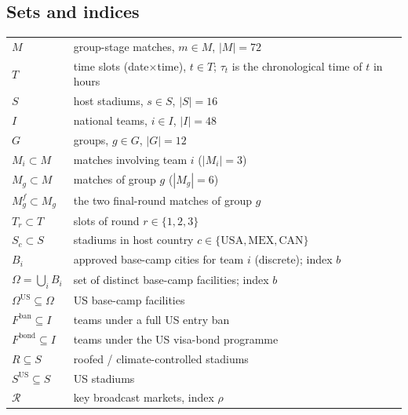 \documentclass[12pt, letterpaper]{article}
\begin{document}
\subsection*{Sets and indices}
\begin{tabular}{@{}lp{11.2cm}@{}}
\toprule
$M$ & group-stage matches, $m\in M$, $|M|=72$ \\
$T$ & time slots (date$\times$time), $t\in T$; $\tau_t$ is the
      chronological time of $t$ in hours \\
$S$ & host stadiums, $s\in S$, $|S|=16$ \\
$I$ & national teams, $i\in I$, $|I|=48$ \\
$G$ & groups, $g\in G$, $|G|=12$ \\
$M_i\subset M$ & matches involving team $i$ ($|M_i|=3$) \\
$M_g\subset M$ & matches of group $g$ ($|M_g|=6$) \\
$M_g^{f}\subset M_g$ & the two final-round matches of group $g$ \\
$T_r\subset T$ & slots of round $r\in\{1,2,3\}$ \\
$S_c\subset S$ & stadiums in host country $c\in\{\mathrm{USA,MEX,CAN}\}$ \\
$B_i$ & approved base-camp cities for team $i$ (discrete); index $b$ \\
$\Omega=\bigcup_i B_i$ & set of distinct base-camp facilities; index $b$ \\
$\Omega^{\mathrm{US}}\subseteq\Omega$ & US base-camp facilities \\
$F^{\mathrm{ban}}\subseteq I$ & teams under a full US entry ban \\
$F^{\mathrm{bond}}\subseteq I$ & teams under the US visa-bond programme \\
$R\subseteq S$ & roofed / climate-controlled stadiums \\
$S^{\mathrm{US}}\subseteq S$ & US stadiums \\
$\mathcal{R}$ & key broadcast markets, index $\rho$ \\
\bottomrule
\end{tabular}
\end{document}
